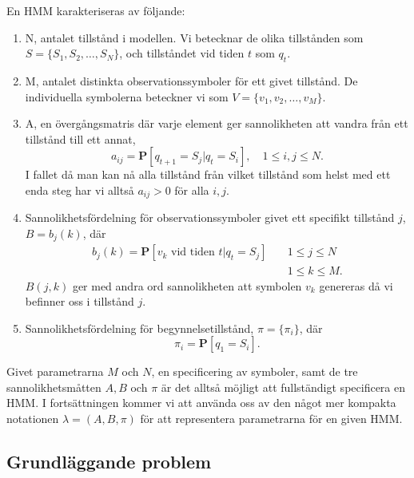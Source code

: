 \documentclass[../rapport_MVEX01-11-05]{subfiles}
\begin{document}
En HMM karakteriseras av följande:
\begin{enumerate}
\item N, antalet tillstånd i modellen. Vi betecknar de olika
  tillstånden som $S = \{S_1, S_2, \dots, S_N\}$, och tillståndet vid
  tiden $t$ som $q_t$.
\item M, antalet distinkta observationssymboler för ett givet
  tillstånd. De individuella symbolerna beteckner vi som $V =
  \{v_1,v_2,\dots,v_M\}$.
\item A, en övergångsmatris där varje element ger sannolikheten att
  vandra från ett tillstånd till ett annat, 
\begin{equation*}
a_{ij} = \textbf{P}[q_{t+1} = S_j | q_t = S_i],\quad 1 \leq i,j \leq N.
\end{equation*}
I fallet då man kan nå alla tillstånd från vilket tillstånd som helst
med ett enda steg har vi alltså $a_{ij} > 0$ för alla $i,j$. 
\item Sannolikhetsfördelning för observationssymboler givet ett
  specifikt tillstånd $j$, $B = b_j(k)$, där 
\begin{align*}
b_j(k) = \textbf{P}[v_k \text{ vid tiden } t|q_t = S_j] \quad &1 \leq j \leq N\\
&1 \leq k \leq M.
\end{align*}
$B(j,k)$ ger med andra ord sannolikheten att symbolen $v_k$ genereras
då vi befinner oss i tillstånd $j$.
\item Sannolikhetsfördelning för begynnelsetillstånd, $\pi =
  \{\pi_i\}$, där
\begin{equation*}
\pi_i = \textbf{P}[q_1 = S_i].
\end{equation*}
\end{enumerate}
Givet parametrarna $M$ och $N$, en specificering av symboler, samt de
tre sannolikhetsmåtten $A, B$ och $\pi$ är det alltså möjligt att
fullständigt specificera en HMM. I fortsättningen kommer vi att
använda oss av den något mer kompakta notationen $\lambda = (A,B,\pi)$
för att representera parametrarna för en given HMM.

\subsection{Grundläggande problem}
\end{document}
